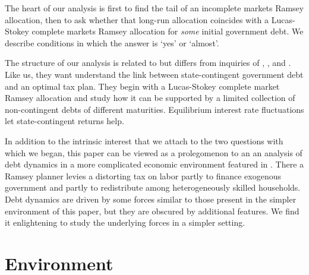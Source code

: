 \documentclass[12pt]{article}
\begin{document}
The heart of our analysis is first to find the tail of an   incomplete markets Ramsey allocation, then to ask whether that long-run allocation coincides with a Lucas-Stokey complete markets Ramsey allocation for {\em some} initial government debt.  We describe conditions in which the
answer is `yes' or `almost'.  

The structure of our analysis is related to but differs from   inquiries of \citet{Angeletos}, \citet{Buera_Nicolini}, and \citet{Shin2007}. Like us, they  want understand the link between state-contingent government  debt and an optimal tax plan. They  begin with a Lucas-Stokey complete market  Ramsey allocation
and study how it  can be supported by  a limited  collection of non-contingent debts of different maturities. Equilibrium interest rate fluctuations
let state-contingent returns help. 

In addition to the intrinsic interest that we attach to the two questions with which we began, this paper can be viewed as
a prolegomenon to an an analysis of debt dynamics in a more complicated   economic environment featured in \citet{BEGS1}.  There
a Ramsey planner levies a distorting tax on labor partly to finance exogenous government  and partly to redistribute among heterogeneously skilled households.
Debt dynamics are driven by some forces similar to those present in the simpler environment of this paper, but they are obscured by 
additional features.  We find it enlightening to study the underlying forces in a simpler setting.

\section{Environment}
\end{document}
